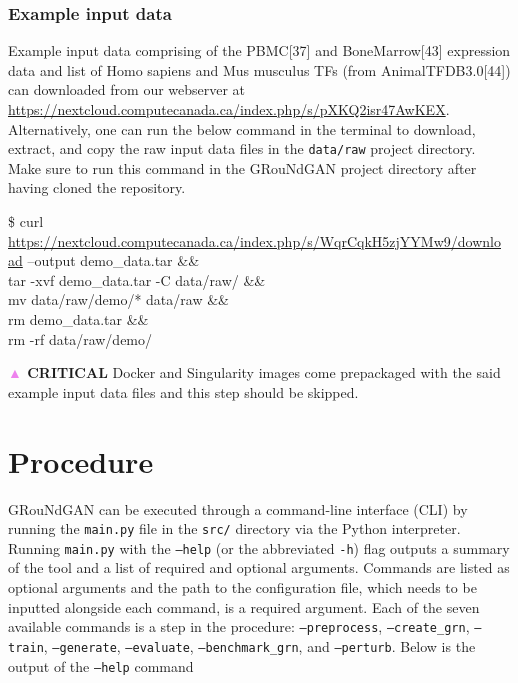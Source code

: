 \begin{tcolorbox}
\subsubsection*{Example input data}
Example input data comprising of the PBMC[37] and BoneMarrow[43] expression data and list of
Homo sapiens and Mus musculus TFs (from AnimalTFDB3.0[44]) can downloaded from our
webserver at \url{https://nextcloud.computecanada.ca/index.php/s/pXKQ2isr47AwKEX}.
Alternatively, one can run the below command in the terminal to download, extract, and copy
the raw input data files in the \texttt{data/raw} project directory. Make sure to run this command in
the GRouNdGAN project directory after having cloned the repository. 
\begin{codeblock}
\$ curl
\url{https://nextcloud.computecanada.ca/index.php/s/WqrCqkH5zjYYMw9/downlo
ad} --output demo\_data.tar \&\&\\
tar -xvf demo\_data.tar -C data/raw/ \&\&\\
mv data/raw/demo/* data/raw \&\&\\
rm demo\_data.tar \&\&\\
rm -rf data/raw/demo/
\end{codeblock}

\textbf{\textcolor{violet}{▲} CRITICAL} Docker and Singularity images come prepackaged with the said example input data
files and this step should be skipped. 

\section*{Procedure}

GRouNdGAN can be executed through a command-line interface (CLI) by running the \texttt{main.py}
file in the \texttt{src/} directory via the Python interpreter. Running \texttt{main.py} with the \texttt{--help} (or the
abbreviated \texttt{-h}) flag outputs a summary of the tool and a list of required and optional arguments.
Commands are listed as optional arguments and the path to the configuration file, which needs
to be inputted alongside each command, is a required argument. Each of the seven available
commands is a step in the procedure: \texttt{--preprocess}, \texttt{--create\_grn}, \texttt{--train}, \texttt{--generate},
\texttt{--evaluate}, \texttt{--benchmark\_grn}, and \texttt{–perturb}. Below is the output of the \texttt{--help}
command


\end{tcolorbox}
